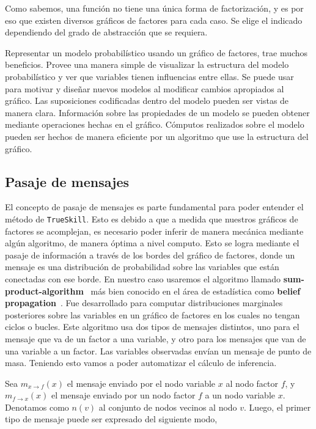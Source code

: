\documentclass[11pt,twoside,spanish]{report} %
\begin{document}
Como sabemos, una funci\'on no tiene una \'unica forma de factorizaci\'on, y es por eso que existen diversos gr\'aficos de factores para cada caso.
Se elige el indicado dependiendo del grado de abstracci\'on que se requiera.


Representar un modelo probabil\'istico usando un gr\'afico de factores, trae muchos beneficios.
Provee una manera simple de visualizar la estructura del modelo probabil\'istico y ver que variables tienen influencias entre ellas.
Se puede usar para motivar y dise\~nar nuevos modelos al modificar cambios apropiados al gr\'afico.
Las suposiciones codificadas dentro del modelo pueden ser vistas de manera clara.
Informaci\'on sobre las propiedades de un modelo se pueden obtener mediante operaciones hechas en el gr\'afico.
C\'omputos realizados sobre el modelo pueden ser hechos de manera eficiente por un algoritmo que use la estructura del gr\'afico.



\subsection{Pasaje de mensajes}\label{Sec:PasajeDeMensajes}

El concepto de pasaje de mensajes es parte fundamental para poder entender el m\'etodo de \texttt{TrueSkill}.
Esto es debido a que a medida que nuestros gr\'aficos de factores se acomplejan,  es necesario poder inferir de manera mec\'anica mediante alg\'un algoritmo, de manera \'optima a nivel computo.
Esto se logra mediante el pasaje de informaci\'on a trav\'es de los bordes del gr\'afico de factores, donde un mensaje es una distribuci\'on de probabilidad sobre las variables que est\'an conectadas con ese borde.
En nuestro caso usaremos el algoritmo llamado \textbf{sum-product-algorithm}~\cite{Kschischang2001} m\'as bien conocido en el \'area de estad\'istica como \textbf{belief propagation}~\cite{pearl1986-beliefNetworks}.
Fue desarrollado para computar distribuciones marginales posteriores sobre las variables en un gr\'afico de factores en los cuales no tengan ciclos o bucles.
Este algoritmo usa dos tipos de mensajes distintos, uno para el mensaje que va de un factor a una variable,  y otro para los mensajes que van de una variable a un factor.
Las variables observadas env\'ian un mensaje de punto de masa.
Teniendo esto vamos a poder automatizar el c\'alculo de inferencia.

Sea $m_{x \rightarrow f}(x)$ el mensaje enviado por el nodo variable $x$ al nodo factor $f$, y $m_{f \rightarrow x}(x)$ el mensaje enviado por un nodo factor $f$ a un nodo variable $x$.
Denotamos como $n(v)$ al conjunto de nodos vecinos al nodo $v$.
Luego, el primer tipo de mensaje puede ser expresado del siguiente modo,
\end{document}

